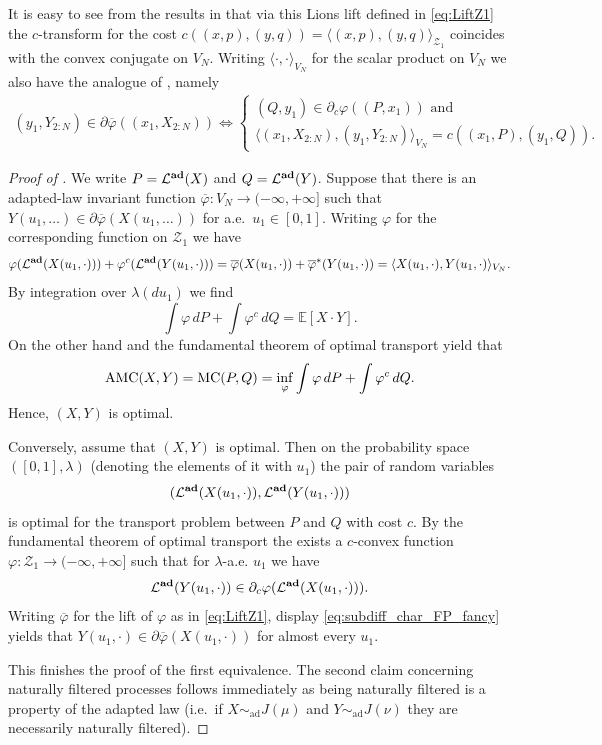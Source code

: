 \documentclass[a4paper]{amsart}
\numberwithin{theorem}{section}
\theoremstyle{definition}
\newcommand{\E}{\mathbb{E}}
\newcommand{\law}{\mathcal{L}}
\newcommand{\simad}{\sim_{\mathrm{ad}}}
\renewcommand{\phi}{\varphi}
\newcommand{\MC}{\textup{MC}}
\newcommand{\Zc}{\mathcal{Z}}
\newcommand{\lawadd}{\law^{\textnormal{\textbf{ad}}}}
\newcommand{\AMC}{\textup{AMC}}
\begin{document}
It is easy to see from the results in  that via this Lions lift defined in \eqref{eq:LiftZ1} the $c$-transform for the cost $c((x,p),(y,q)) = \langle(x,p),(y,q) \rangle_{\Zc_1}$ coincides with the convex conjugate on $V_N$. Writing $\langle\cdot,\cdot\rangle_{V_N}$ for the scalar product on $V_N$ we also have the analogue of , namely
\begin{align}\label{eq:subdiff_char_FP_fancy}
    (y_1,Y_{2:N}) \in \partial \overline{\phi}((x_1,X_{2:N})) \iff \begin{cases}
       (Q,y_1) \in \partial_{c} \phi((P,x_1)) \text{ and } \\ 
       \langle (x_1,X_{2:N}), (y_1,Y_{2:N}) \rangle_{V_N} = c((x_1,P),(y_1,Q)).  
    \end{cases}
\end{align}


\begin{proof}[Proof of ]
We write $P = \lawadd(X)$ and $Q= \lawadd(Y)$. Suppose that there is an adapted-law invariant function $\overline{\phi} : V_N \to (-\infty,+\infty]$ such that $Y(u_1, \ldots) \in \partial \overline{\phi}( X(u_1, \ldots))$ for a.e.\ $ u_1\in [0,1]$. Writing $\phi$ for the corresponding function on $\Zc_1$ we have 
\[
\phi(\lawadd(X(u_1,\cdot))) + \phi^c(\lawadd(Y(u_1,\cdot))) = \overline{\phi}(X(u_1,\cdot)) + \overline{\phi}^\ast(Y(u_1,\cdot)) = \langle X(u_1,\cdot) , Y(u_1,\cdot) \rangle_{V_N}.
\]
By integration over $\lambda(du_1)$ we find
\[
\int \phi \, dP + \int \phi^c \, dQ = \E[ X \cdot Y].
\]
On the other hand  and the fundamental theorem of optimal transport yield that
\[
\AMC(X,Y) = \MC(P,Q) = \inf_{\phi} \int \phi \, dP + \int \phi^c \, dQ .
\]
Hence, $(X,Y)$ is optimal. 

Conversely, assume that $(X,Y)$ is optimal. Then on the probability space $([0,1],\lambda)$ (denoting the elements of it with $u_1$) the pair of random variables 
\[
( \lawadd(X(u_1,\cdot)), \lawadd(Y(u_1,\cdot))  )
\]
is optimal for the transport problem between $P$ and $Q$ with cost $c$. By the fundamental theorem of optimal transport the exists a $c$-convex function $\phi : \Zc_1 \to (-\infty,+\infty]$ such that for $\lambda$-a.e. $u_1$ we have 
\[
\lawadd(Y(u_1,\cdot)) \in \partial_c \phi(  \lawadd(X(u_1,\cdot))). 
\]
Writing $\overline{\phi}$ for the lift of $\phi$ as in \eqref{eq:LiftZ1}, display \eqref{eq:subdiff_char_FP_fancy} yields that $Y(u_1,\cdot) \in \partial\overline{\phi}(X(u_1,\cdot))$ for almost every $u_1$. 

This finishes the proof of the first equivalence. The second claim concerning naturally filtered processes follows immediately as being naturally filtered is a property of the adapted law (i.e.\  if $X \simad J(\mu)$ and $Y \simad J(\nu)$ they are necessarily naturally filtered). 
\end{proof}
\end{document}
